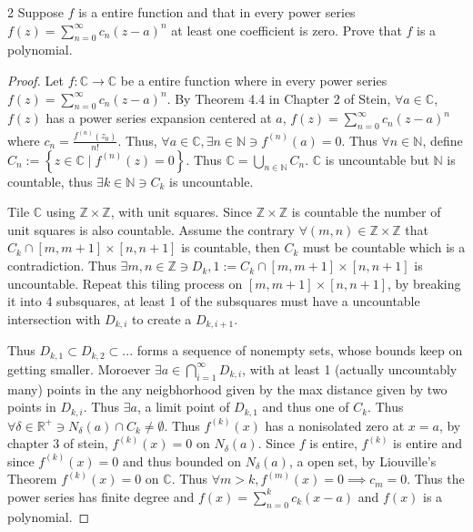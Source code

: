 \documentclass{article}
\newcommand{\C}{\mathbb{C}}
\newcommand{\R}{\mathbb{R}}
\newcommand{\Z}{\mathbb{Z}}
\newcommand{\N}{\mathbb{N}}
\begin{document}
\begin{PROB}{2}\label{Problem 2.}
    Suppose $f$ is a entire function and that in every power series $f(z) = \sum_{n = 0}^{\infty}c_n (z - a)^n$ at least one coefficient is zero. Prove that $f$ is a polynomial.   
\end{PROB}
\begin{proof}
    Let $f: \C \to \C$ be a entire function where in every power series $f(z) = \sum_{n = 0}^{\infty} c_n (z - a)^n$. By Theorem 4.4 in Chapter 2 of Stein, $\forall a \in \C$, $f(z)$ has a power series expansion centered at $a$, $f(z) = \sum_{n = 0}^{\infty} c_n (z - a)^n$ where $c_n = \frac{f^{(n)}(z_0)}{n!}$. Thus, $\forall a \in \C, \exists n \in \N \ni f^{(n)}(a) = 0$. Thus $\forall n \in \N$, define $C_n := \left\{ z \in \C \mid f^{(n)}(z) = 0 \right\}$. Thus $\C = \bigcup_{n \in \N} C_n$. $\C$ is uncountable but $\N$ is countable, thus $\exists k \in \N \ni C_k$ is uncountable.
    
    Tile $\C$ using $\Z \times \Z$, with unit squares. Since $\Z \times \Z$ is countable the number of unit squares is also countable. Assume the contrary $\forall (m, n) \in \Z \times \Z$ that $C_k \cap [m, m + 1] \times [n, n + 1]$ is countable, then $C_k$ must be countable which is a contradiction. Thus $\exists m, n \in \Z \ni D_k,1 := C_k \cap [m, m + 1] \times [n, n + 1]$ is uncountable. Repeat this tiling process on $[m, m + 1] \times [n, n + 1]$, by breaking it into 4 subsquares, at least 1 of the subsquares must have a uncountable intersection with $D_{k, i}$ to create a $D_{k, i + 1}$. 
    
    Thus $D_{k, 1} \subset D_{k, 2} \subset ...$ forms a sequence of nonempty sets, whose bounds keep on getting smaller. Moroever $\exists a \in \bigcap_{i = 1}^{\infty}D_{k, i}$, with at least 1 (actually uncountably many) points in the any neigbhorhood given by the max distance given by two points in $D_{k, i}$. Thus $\exists a$, a limit point of $D_{k, 1}$ and thus one of $C_k$. Thus $\forall \delta \in \R^+ \ni N_{\delta}(a) \cap C_k \neq \emptyset$. Thus $f^{(k)}(x)$ has a nonisolated zero at $x = a$, by chapter 3 of stein, $f^{(k)}(x) = 0$ on $N_\delta(a)$. Since $f$ is entire, $f^{(k)}$ is entire and since $f^{(k)}(x) = 0$ and thus bounded on $N_{\delta}(a)$, a open set, by Liouville's Theorem $f^{(k)}(x) = 0$ on $\C$. Thus $\forall m > k, f^{(m)}(x) = 0 \implies c_m = 0$. Thus the power series has finite degree and $f(x) = \sum_{n = 0}^{k}c_k(x - a)$ and $f(x)$ is a polynomial.             
\end{proof}
\end{document}

